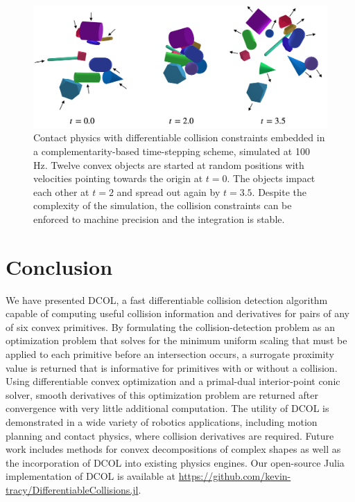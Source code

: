 \begin{figure}[t]
\centerline{\includegraphics[width = .98\columnwidth]{figures/mashup.png}}
\caption{Contact physics with differentiable collision constraints embedded in a complementarity-based time-stepping scheme, simulated at 100 Hz.  Twelve convex objects are started at random positions with velocities pointing towards the origin at $t=0$. The objects impact each other at $t=2$ and spread out again by $t=3.5$.  Despite the complexity of the simulation, the collision constraints can be enforced to machine precision and the integration is stable.}
\label{fig:mashup}
\vspace{-10pt}
\end{figure}
\section{Conclusion}\label{sec:dcol:conclusion}
We have presented DCOL, a fast differentiable collision detection algorithm capable of computing useful collision information and derivatives for pairs of any of six convex primitives. By formulating the collision-detection problem as an optimization problem that solves for the minimum uniform scaling that must be applied to each primitive before an intersection occurs, a surrogate proximity value is returned that is informative for primitives with or without a collision. Using differentiable convex optimization and a primal-dual interior-point conic solver, smooth derivatives of this optimization problem are returned after convergence with very little additional computation. The utility of DCOL is demonstrated in a wide variety of robotics applications, including motion planning and contact physics, where collision derivatives are required. Future work includes methods for convex decompositions of complex shapes as well as the incorporation of DCOL into existing physics engines. Our open-source Julia implementation of DCOL is available at \url{https://github.com/kevin-tracy/DifferentiableCollisions.jl}. 




